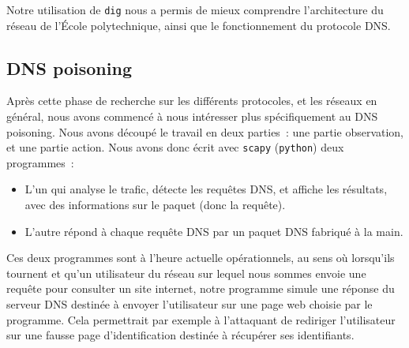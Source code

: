 \documentclass[a4paper, 12pt,twoside]{article}
\begin{document}
            Notre  utilisation de \verb!dig! nous a permis de mieux comprendre l'architecture du réseau de l'École polytechnique, ainsi que le fonctionnement du protocole DNS.

        \subsection{DNS poisoning}

            Après cette phase de recherche sur les différents protocoles, et les réseaux en général, nous avons commencé à nous intéresser plus spécifiquement au DNS poisoning. Nous avons découpé le travail en deux parties~: une partie observation, et une partie action. Nous avons donc écrit avec \verb!scapy! (\verb!python!) deux programmes~:
            \begin{itemize}[label=\color{bleu303}\textbullet{}]
                \item L'un qui analyse le trafic, détecte les requêtes DNS, et affiche les résultats, avec des informations sur le paquet (donc la requête).
                \item L'autre répond à chaque requête DNS par un paquet DNS fabriqué à la main.
            \end{itemize}

            Ces deux programmes sont à l'heure actuelle opérationnels, au sens où lorsqu'ils tournent et qu'un utilisateur du réseau sur lequel nous sommes envoie une requête pour consulter un site internet, notre programme simule une réponse du serveur DNS destinée à envoyer l'utilisateur sur une page web choisie par le programme. Cela permettrait par exemple à l'attaquant de rediriger l'utilisateur sur une fausse page d'identification destinée à récupérer ses identifiants.
\end{document}
